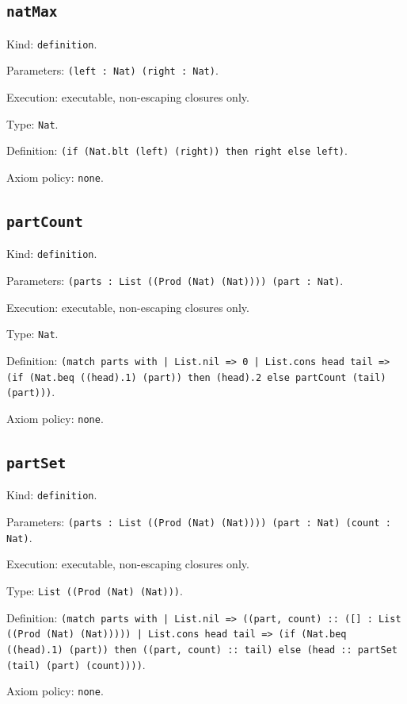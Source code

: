 \documentclass[11pt]{article}
\begin{document}
\subsection*{\texttt{natMax}}
\noindent Kind: \texttt{definition}.\par
\noindent Parameters: \texttt{(left : Nat) (right : Nat)}.\par
\noindent Execution: executable, non-escaping closures only.\par
\noindent Type: \texttt{Nat}.\par
\noindent Definition: \texttt{(if (Nat.blt (left) (right)) then right else left)}.\par
\noindent Axiom policy: \texttt{none}.\par
\subsection*{\texttt{partCount}}
\noindent Kind: \texttt{definition}.\par
\noindent Parameters: \texttt{(parts : List ((Prod (Nat) (Nat)))) (part : Nat)}.\par
\noindent Execution: executable, non-escaping closures only.\par
\noindent Type: \texttt{Nat}.\par
\noindent Definition: \texttt{(match parts with | List.nil => 0 | List.cons head tail => (if (Nat.beq ((head).1) (part)) then (head).2 else partCount (tail) (part)))}.\par
\noindent Axiom policy: \texttt{none}.\par
\subsection*{\texttt{partSet}}
\noindent Kind: \texttt{definition}.\par
\noindent Parameters: \texttt{(parts : List ((Prod (Nat) (Nat)))) (part : Nat) (count : Nat)}.\par
\noindent Execution: executable, non-escaping closures only.\par
\noindent Type: \texttt{List ((Prod (Nat) (Nat)))}.\par
\noindent Definition: \texttt{(match parts with | List.nil => ((part, count) :: ([] : List ((Prod (Nat) (Nat))))) | List.cons head tail => (if (Nat.beq ((head).1) (part)) then ((part, count) :: tail) else (head :: partSet (tail) (part) (count))))}.\par
\noindent Axiom policy: \texttt{none}.\par
\end{document}
